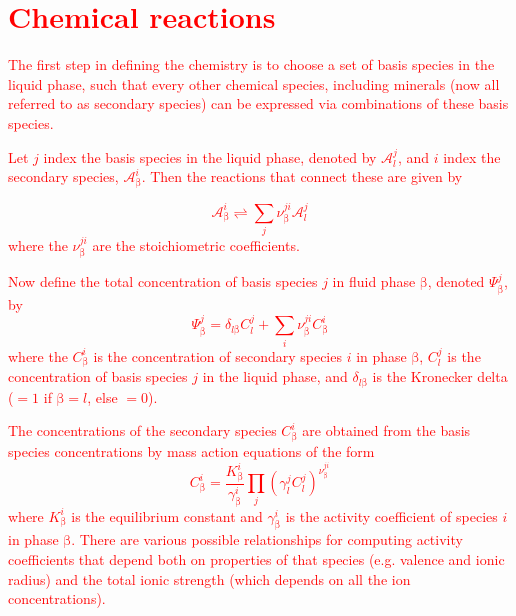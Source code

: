 \documentclass[12pt]{report}
\def\phase{\mathrm{\beta}}
\begin{document}
\section{\textcolor{red}{Chemical reactions}}

\textcolor{red}{
The first step in defining the chemistry is to choose a set of basis
species  in the liquid phase, such that every other chemical species,
including minerals (now all referred to as secondary species) can be
expressed via combinations of these basis  species.}

\textcolor{red}{
Let $j$ index the basis species in the liquid phase, denoted by
$\mathcal{A}^{j}_{l}$, and $i$ index the secondary species,
$\mathcal{A}^{i}_{\phase}$. Then the reactions that connect these are
given by
}

\textcolor{red}{
\begin{equation}
  \mathcal{A}_{\phase}^{i} \rightleftharpoons \sum_{j} \nu_{\phase}^{ji} \mathcal{A}_{l}^{j}
\end{equation}
where the $\nu_{\phase}^{ji}$ are the stoichiometric coefficients.
}

\textcolor{red}{
Now define the total concentration of basis species $j$ in fluid phase
$\phase$, denoted $\Psi_{\phase}^{j}$, by
\begin{equation}
  \Psi_{\phase}^{j}=\delta_{l \phase} C_{l}^{j}+ \sum_{i}
  \nu_{\phase}^{ji} C_{\phase}^{i}
\end{equation}
where the $C_{\phase}^{i}$ is the concentration of secondary species
$i$ in phase $\phase$,  $C_{l}^{j}$ is the concentration of basis
species $j$ in the liquid phase, and $\delta_{l \phase}$ is the
Kronecker delta ($=1$ if $\phase = l$, else $=0$).
}

\textcolor{red}{
The concentrations of the secondary species $C_{\phase}^{i}$ are
obtained from the basis species concentrations by mass action
equations of the form
\begin{equation}
  C_{\phase}^{i} = \frac{K_{\phase}^{i}}{\gamma_{\phase}^{i}}
  \prod_{j} (\gamma_{l}^{j} C_{l}^{j})^{\nu_{\phase}^{j i}}
\end{equation}
where $K_{\phase}^{i}$ is the equilibrium constant and
$\gamma_{\phase}^{i}$ is the activity coefficient of species $i$ in
phase $\phase$. There are various possible relationships for computing
activity coefficients that depend both on properties of that species
(e.g. valence and ionic radius) and the total ionic strength (which
depends on all the ion concentrations).
}
\end{document}
